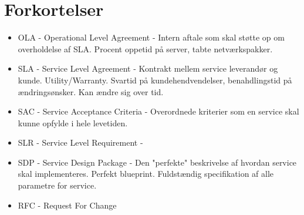 \section{Forkortelser}
\begin{itemize}
\item OLA - Operational Level Agreement - Intern aftale som skal støtte op om overholdelse af SLA. Procent oppetid på server, tabte netværkspakker.
\item SLA - Service Level Agreement - Kontrakt mellem service leverandør og kunde. Utility/Warranty. Svartid på kundehendvendelser, benahdlingstid på ændringsønsker. Kan ændre sig over tid.
\item SAC - Service Acceptance Criteria - Overordnede kriterier som en service skal kunne opfylde i hele levetiden.
\item SLR - Service Level Requirement - 
\item SDP - Service Design Package - Den "perfekte" beskrivelse af hvordan service skal implementeres. Perfekt blueprint. Fuldstændig specifikation af alle parametre for service.
\item RFC - Request For Change
\end{itemize}





%
%


